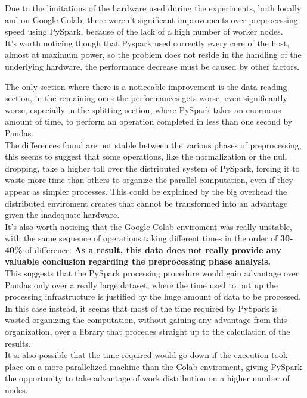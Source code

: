 \documentclass[
	letterpaper, %
	10pt, %
]{class}
\begin{document}
Due to the limitations of the hardware used during the experiments, both locally and on Google Colab, there weren't significant improvements over preprocessing speed using PySpark, because of the lack of a high number of worker nodes.\\
It's worth noticing though that Pyspark used correctly every core of the host, almost at maximum power, so the problem does not reside in the handling of the underlying hardware, the performance decrease must be caused by other factors.

The only section where there is a noticeable improvement is the data reading section, in the remaining ones the performances gets worse, even significantly worse, especially in the splitting section, where PySpark takes an enormous amount of time, to perform
an operation completed in less than one second by Pandas.\\

The differences found are not stable between the various phases of preprocessing, this seems to suggest that some operations, like the normalization or the null dropping, take a higher toll over the distributed system of PySpark,
forcing it to waste more time than others to organize the parallel computation, even if they appear as simpler processes.
This could be explained by the big overhead the distributed enviroment creates that cannot be transformed into an advantage given the inadequate hardware.\\

It's also worth noticing that the Google Colab enviroment was really unstable, with the same sequence of operations taking different times in the order of \textbf{30-40\%} of difference.
\textbf{As a result, this data does not really provide any valuable conclusion regarding the preprocessing phase analysis.}\\

This suggests that the PySpark processing procedure would gain advantage over Pandas only over a really large dataset, where the time used to put up the processing infrastructure is justified by the huge amount of data to be processed.
In this case instead, it seems that most of the time required by PySpark is wasted organizing the computation, without gaining any advantage from this organization, over a library that procedes straight up to the calculation of the results.\\

It si also possible that the time required would go down if the execution took place on a more parallelized machine than the Colab enviroment, giving PySpark the opportunity to take advantage of work distribution on a higher number of nodes.
\end{document}
